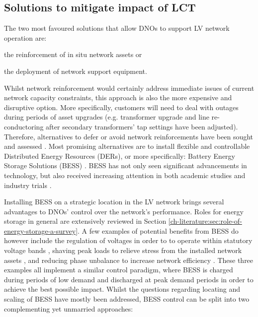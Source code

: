 \subsection{Solutions to mitigate impact of LCT}
\label{ch-introduction:subsec:solutions-to-mitigate-impact-of-lct}

The two most favoured solutions that allow DNOs to support LV network operation are:
\begin{enumerate*}
	\item the reinforcement of in situ network assets or
	\item the deployment of network support equipment.
\end{enumerate*}
Whilst network reinforcement would certainly address immediate issues of current network capacity constraints, this approach is also the more expensive and disruptive option.
More specifically, customers will need to deal with outages during periods of asset upgrades (e.g. transformer upgrade and line re-conductoring after secondary transformers' tap settings have been adjusted).
Therefore, alternatives to defer or avoid network reinforcements have been sought and assessed \cite{Harrison2007, Zangs2016a, VanderKlauw2016d, Greenwood2017}.
Most promising alternatives are to install flexible and controllable Distributed Energy Resources (DERs), or more specifically: Battery Energy Storage Solutions (BESS) \cite{Wade2010}.
BESS has not only seen significant advancements in technology, but also received increasing attention in both academic studies and industry trials \cite{Palizban2016}.

Installing BESS on a strategic location in the LV network brings several advantages to DNOs' control over the network's performance.
Roles for energy storage in general are extensively reviewed in Section \ref{ch-literature:sec:role-of-energy-storage-a-survey}.
A few examples of potential benefits from BESS do however include the regulation of voltages in order to to operate within statutory voltage bands \cite{Yang2014}, shaving peak loads to relieve stress from the installed network assets \cite{Bennett2015}, and reducing phase unbalance to increase network efficiency \cite{Wang2015b}.
These three examples all implement a similar control paradigm, where BESS is charged during periods of low demand and discharged at peak demand periods in order to achieve the best possible impact.
Whilst the questions regarding locating and scaling of BESS have mostly been addressed, BESS control can be split into two complementing yet unmarried approaches:

